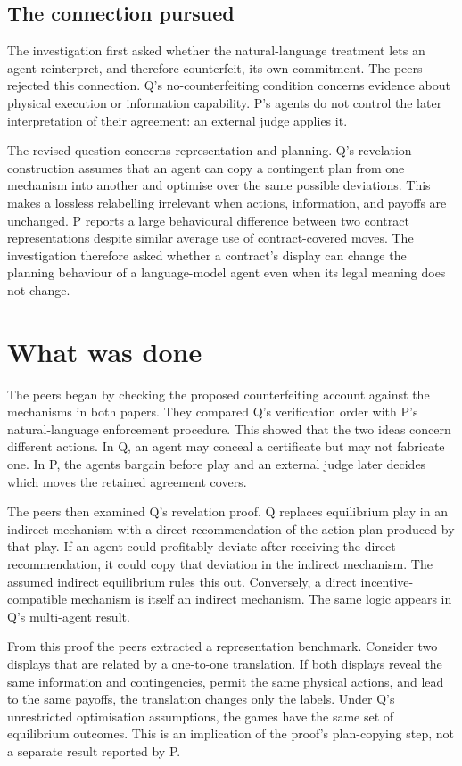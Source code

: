 \documentclass{article}
\begin{document}
\subsection*{The connection pursued}

The investigation first asked whether the natural-language treatment lets an agent reinterpret, and therefore counterfeit, its own commitment.  The peers rejected this connection.  Q's no-counterfeiting condition concerns evidence about physical execution or information capability.  P's agents do not control the later interpretation of their agreement: an external judge applies it.

The revised question concerns representation and planning.  Q's revelation construction assumes that an agent can copy a contingent plan from one mechanism into another and optimise over the same possible deviations.  This makes a lossless relabelling irrelevant when actions, information, and payoffs are unchanged.  P reports a large behavioural difference between two contract representations despite similar average use of contract-covered moves.  The investigation therefore asked whether a contract's display can change the planning behaviour of a language-model agent even when its legal meaning does not change.

\section{What was done}

The peers began by checking the proposed counterfeiting account against the mechanisms in both papers.  They compared Q's verification order with P's natural-language enforcement procedure.  This showed that the two ideas concern different actions.  In Q, an agent may conceal a certificate but may not fabricate one.  In P, the agents bargain before play and an external judge later decides which moves the retained agreement covers.

The peers then examined Q's revelation proof.  Q replaces equilibrium play in an indirect mechanism with a direct recommendation of the action plan produced by that play.  If an agent could profitably deviate after receiving the direct recommendation, it could copy that deviation in the indirect mechanism.  The assumed indirect equilibrium rules this out.  Conversely, a direct incentive-compatible mechanism is itself an indirect mechanism.  The same logic appears in Q's multi-agent result.

From this proof the peers extracted a representation benchmark.  Consider two displays that are related by a one-to-one translation.  If both displays reveal the same information and contingencies, permit the same physical actions, and lead to the same payoffs, the translation changes only the labels.  Under Q's unrestricted optimisation assumptions, the games have the same set of equilibrium outcomes.  This is an implication of the proof's plan-copying step, not a separate result reported by P.
\end{document}

